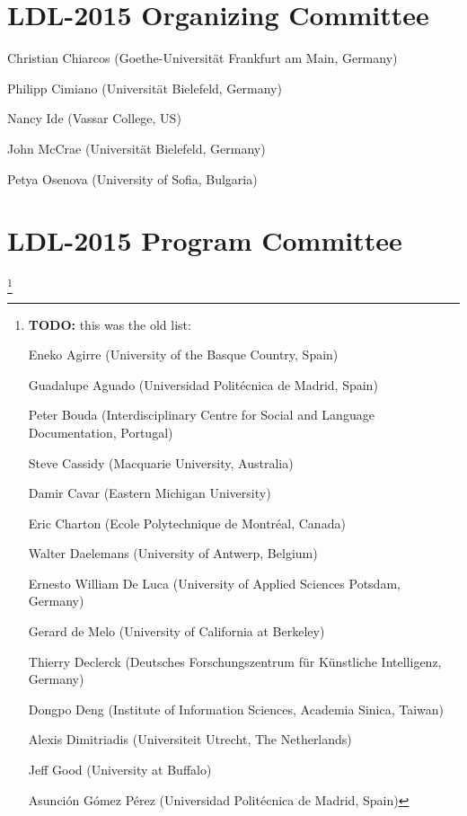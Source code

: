 \documentclass[11pt]{article}
\newcommand{\todo}[1]{\footnote{\textbf{TODO:} #1 }}
\begin{document}
\begin{figure*}[t]
\begin{minipage}{\textwidth}
\section*{LDL-2015 Organizing Committee}

\smallskip

Christian Chiarcos (Goethe-Universität Frankfurt am Main, Germany)

Philipp Cimiano (Universität Bielefeld, Germany)

Nancy Ide (Vassar College, US)

John McCrae (Universität Bielefeld, Germany)

Petya Osenova (University of Sofia, Bulgaria)

\bigskip

\section*{LDL-2015 Program Committee}

\smallskip


\todo{ this was the old list:

	Eneko Agirre (University of the Basque Country, Spain)

	Guadalupe Aguado (Universidad Politécnica de Madrid, Spain)

	Peter Bouda (Interdisciplinary Centre for Social and Language Documentation, Portugal)

	Steve Cassidy (Macquarie University, Australia)

	Damir Cavar (Eastern Michigan University)

	Eric Charton (Ecole Polytechnique de Montréal, Canada)

	Walter Daelemans (University of Antwerp, Belgium)

	Ernesto William De Luca (University of Applied Sciences Potsdam, Germany)

	Gerard de Melo (University of California at Berkeley)

	Thierry Declerck (Deutsches Forschungszentrum für Künstliche Intelligenz, Germany)

	Dongpo Deng (Institute of Information Sciences, Academia Sinica, Taiwan)

	Alexis Dimitriadis (Universiteit Utrecht, The Netherlands)

	Jeff Good (University at Buffalo)

	Asunción Gómez Pérez (Universidad Politécnica de Madrid, Spain)

}
\end{minipage}
\end{figure*}
\end{document}
